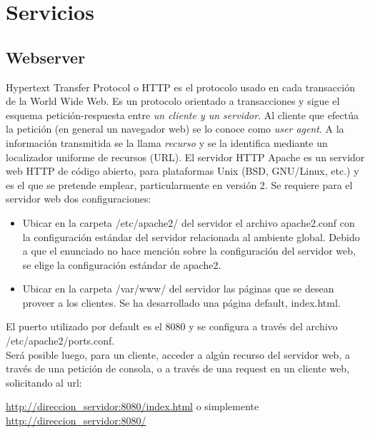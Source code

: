 \section{Servicios}
	\subsection{Webserver}

	\indent Hypertext Transfer Protocol o HTTP es el protocolo usado en cada transacción de la World Wide Web.  Es un protocolo orientado a transacciones y sigue el esquema petición-respuesta entre \textit{un cliente y un servidor}. Al cliente que efectúa la petición (en general un navegador web) se lo conoce como \textit{user agent}. A la información transmitida se la llama \textit{recurso} y se la identifica mediante un localizador uniforme de recursos (URL).
\indent El servidor HTTP Apache es un servidor web HTTP de código abierto, para plataformas Unix (BSD, GNU/Linux, etc.) y es el que se pretende emplear, particularmente en versión 2.
\indent Se requiere para el servidor web dos configuraciones:
\begin{itemize}
\item Ubicar en la carpeta /etc/apache2/ del servidor el archivo apache2.conf con la configuración estándar del servidor relacionada al ambiente global. Debido a que el enunciado no hace mención sobre la configuración del servidor web, se elige la configuración estándar de apache2.

\item Ubicar en la carpeta /var/www/ del servidor las páginas que se desean proveer a los clientes. Se ha desarrollado una página default, index.html.
\end{itemize}

\indent El puerto utilizado por default es el 8080 y se configura a través del archivo /etc/apache2/ports.conf.\\
\indent Será posible luego, para un cliente, acceder a algún recurso del servidor web, a través de una petición de consola, o a través de una request en un cliente web, solicitando al url:

\url{http://direccion_servidor:8080/index.html}
o simplemente
\url{http://direccion_servidor:8080/}


